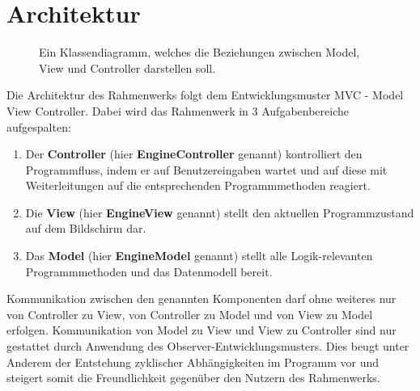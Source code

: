 \section{Architektur}

\begin{figure}[ht!]
	\centering
	\begin{center}
	\end{center}
     \caption{Ein Klassendiagramm, welches die Beziehungen zwischen Model, View und Controller darstellen soll.}
     \label{fig:class_diagram:mvc}
\end{figure}

Die Architektur des Rahmenwerks folgt dem Entwicklungsmuster MVC - Model View Controller. Dabei wird das Rahmenwerk in 3 Aufgabenbereiche aufgespalten:
\begin{enumerate}
\item Der \textbf{Controller} (hier \textbf{EngineController} genannt) kontrolliert den Programmfluss, indem er auf Benutzereingaben wartet und auf diese mit  Weiterleitungen auf die entsprechenden Programmmethoden reagiert.
\item Die \textbf{View} (hier \textbf{EngineView} genannt) stellt den aktuellen Programmzustand auf dem Bildschirm dar.
\item Das \textbf{Model} (hier \textbf{EngineModel} genannt) stellt alle Logik-relevanten Programmmethoden und das Datenmodell bereit.
\end{enumerate}
Kommunikation zwischen den genannten Komponenten darf ohne weiteres nur von Controller zu View, von Controller zu Model und von View zu Model erfolgen.
Kommunikation von Model zu View und View zu Controller sind nur gestattet durch Anwendung des Observer-Entwicklungsmusters. Dies beugt unter Anderem der Entstehung zyklischer Abhängigkeiten im Programm vor und steigert somit die Freundlichkeit gegenüber den Nutzern des Rahmenwerks.